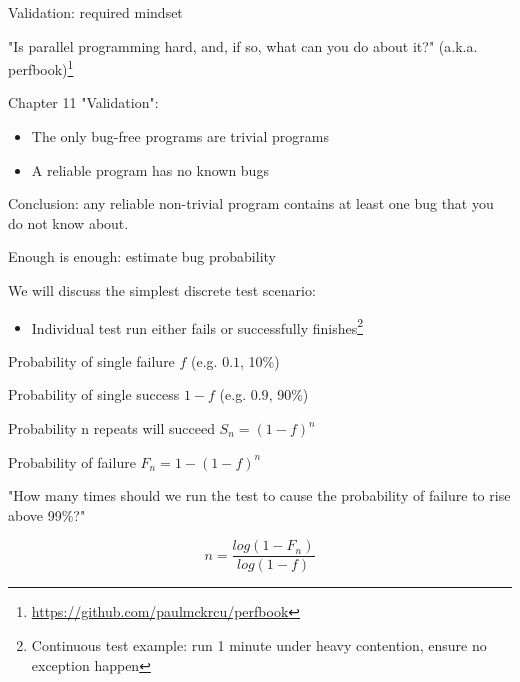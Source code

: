 \begin{frame}{Validation: required mindset}

"Is parallel programming hard, and, if so, what can you do about it?" (a.k.a. perfbook)\footnote{\tiny\url{https://github.com/paulmckrcu/perfbook}}

Chapter 11 "Validation":

\pause

\begin{itemize}
  \item The only bug-free programs are trivial programs
  \pause
  \item A reliable program has no known bugs
\end{itemize}

\pause
Conclusion: \pause any reliable non-trivial program contains at least one bug that you do not know about.

\end{frame}

\begin{frame}{Enough is enough: estimate bug probability}

We will discuss the simplest discrete test scenario:
\begin{itemize}
  \item Individual test run either fails or successfully finishes\footnote{Continuous test example: run 1 minute under heavy contention, ensure no exception happen}
\end{itemize}

\pause
Probability of single failure $f$ (e.g. $0.1$, 10\%)

\pause
Probability of single success  $1 - f$ (e.g. $0.9$, 90\%)

\pause
Probability n repeats will succeed $S_n=(1-f)^n$

\pause
Probability of failure $F_n=1-(1-f)^n$

\pause
"How many times should we run the test to cause the probability of failure to rise above 99\%?" \pause

$$n=\frac{log(1-F_n)}{log(1-f)}$$

\end{frame}


